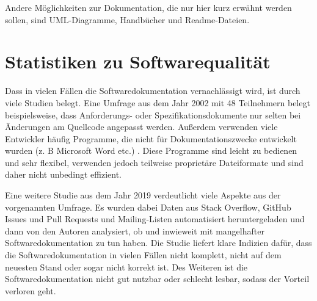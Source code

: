 Andere Möglichkeiten zur Dokumentation, die nur hier kurz erwähnt werden sollen, sind UML-Diagramme, Handbücher und  Readme-Dateien.


\section{Statistiken zu Softwarequalität}
Dass in vielen Fällen die Softwaredokumentation vernachlässigt wird, ist durch viele Studien belegt. Eine Umfrage aus dem Jahr 2002 mit 48 Teilnehmern belegt beispielsweise, dass Anforderungs- oder Spezifikationsdokumente nur selten bei Änderungen am Quellcode angepasst werden. Außerdem verwenden viele Entwickler häufig Programme, die nicht für Dokumentationszwecke entwickelt wurden (z. B Microsoft Word etc.) \cite[S. 28-29]{TheRelevanceofSoftwareDocumentationToolsandTechnologies:ASurvey}. Diese Programme sind leicht zu bedienen und sehr flexibel, verwenden jedoch teilweise proprietäre Dateiformate und sind daher nicht unbedingt effizient.

Eine weitere Studie aus dem Jahr 2019 verdeutlicht viele Aspekte aus der vorgenannten Umfrage. Es wurden dabei Daten aus Stack Overflow, GitHub Issues und Pull Requests und Mailing-Listen automatisiert heruntergeladen und dann von den Autoren analysiert, ob und inwieweit mit mangelhafter Softwaredokumentation zu tun haben.  Die Studie liefert klare Indizien dafür, dass die Softwaredokumentation in vielen Fällen nicht komplett, nicht auf dem neuesten Stand oder sogar nicht korrekt ist. Des Weiteren ist die Softwaredokumentation nicht gut nutzbar oder schlecht lesbar, sodass der Vorteil verloren geht\cite[S.1201 -1204]{SoftwareDocumentationIssuesUnveiled}.
